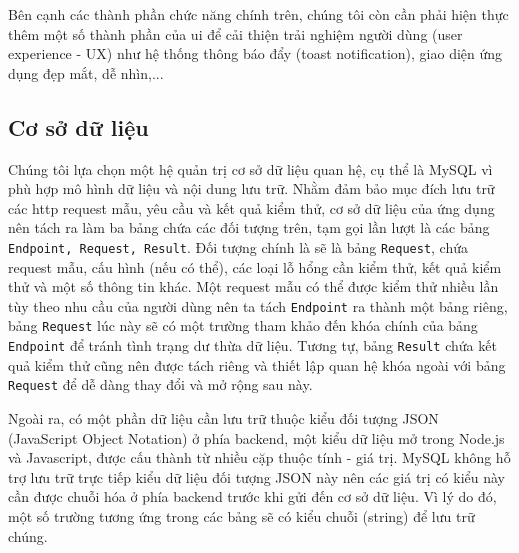 Bên cạnh các thành phần chức năng chính trên, chúng tôi còn cần phải hiện thực thêm một số thành phần của \acrshort{ui} để cải thiện trải nghiệm người dùng (user experience - UX) như hệ thống thông báo đẩy (toast notification), giao diện ứng dụng đẹp mắt, dễ nhìn,...
\subsection{Cơ sở dữ liệu}
Chúng tôi lựa chọn một hệ quản trị cơ sở dữ liệu quan hệ, cụ thể là MySQL vì phù hợp mô hình dữ liệu và nội dung lưu trữ. Nhằm đảm bảo mục đích lưu trữ các \acrshort{http} request mẫu, yêu cầu và kết quả kiểm thử, cơ sở dữ liệu của ứng dụng nên tách ra làm ba bảng chứa các đối tượng trên, tạm gọi lần lượt là các bảng \texttt{Endpoint, Request, Result}. Đối tượng chính là sẽ là bảng \texttt{Request}, chứa request mẫu, cấu hình (nếu có thể), các loại lỗ hổng cần kiểm thử, kết quả kiểm thử và một số thông tin khác. Một request mẫu có thể được kiểm thử nhiều lần tùy theo nhu cầu của người dùng nên ta tách \texttt{Endpoint} ra thành một bảng riêng, bảng \texttt{Request} lúc này sẽ có một trường tham khảo đến khóa chính của bảng \texttt{Endpoint} để tránh tình trạng dư thừa dữ liệu. Tương tự, bảng \texttt{Result} chứa kết quả kiểm thử cũng nên được tách riêng và thiết lập quan hệ khóa ngoài với bảng \texttt{Request} để dễ dàng thay đổi và mở rộng sau này.\par
Ngoài ra, có một phần dữ liệu cần lưu trữ thuộc kiểu đối tượng JSON (JavaScript Object Notation) ở phía backend, một kiểu dữ liệu mở trong Node.js và Javascript, được cấu thành từ nhiều cặp thuộc tính - giá trị. MySQL không hỗ trợ lưu trữ trực tiếp kiểu dữ liệu đối tượng JSON này nên các giá trị có kiểu này cần được chuỗi hóa ở phía backend trước khi gửi đến cơ sở dữ liệu. Vì lý do đó, một số trường tương ứng trong các bảng sẽ có kiểu chuỗi (string) để lưu trữ chúng.